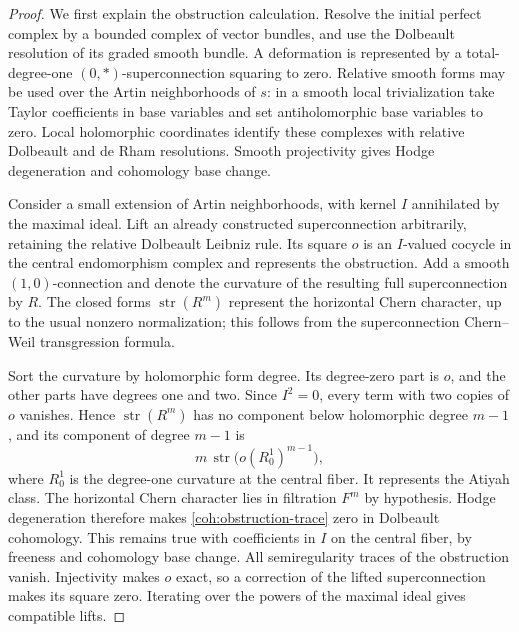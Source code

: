 \documentclass[11pt]{article}
\numberwithin{equation}{section}
\theoremstyle{definition}
\theoremstyle{remark}
\begin{document}
\begin{proof}
We first explain the obstruction calculation.  Resolve the initial
perfect complex by a bounded complex of vector bundles, and use the
Dolbeault resolution of its graded smooth bundle.  A deformation is
represented by a total-degree-one \((0,*)\)-superconnection squaring
to zero.  Relative smooth forms may be used over the Artin
neighborhoods of \(s\): in a smooth local trivialization take Taylor
coefficients in base variables and set antiholomorphic base variables
to zero.  Local holomorphic coordinates identify these complexes with
relative Dolbeault and de Rham resolutions.  Smooth projectivity gives
Hodge degeneration and cohomology base change.

Consider a small extension of Artin neighborhoods, with kernel \(I\)
annihilated by the maximal ideal.  Lift an already constructed
superconnection arbitrarily, retaining the relative Dolbeault Leibniz
rule.  Its square \(o\) is an \(I\)-valued cocycle in the central
endomorphism complex and represents the obstruction.  Add a smooth
\((1,0)\)-connection and denote the curvature of the resulting full
superconnection by \(R\).  The closed forms \(\operatorname{str}(R^m)\) represent
the horizontal Chern character, up to the usual nonzero normalization;
this follows from the superconnection Chern--Weil transgression
formula.

Sort the curvature by holomorphic form degree.  Its degree-zero part
is \(o\), and the other parts have degrees one and two.  Since
\(I^2=0\), every term with two copies of \(o\) vanishes.  Hence
\(\operatorname{str}(R^m)\) has no component below holomorphic degree \(m-1\),
and its component of degree \(m-1\) is
\begin{equation}\label{coh:obstruction-trace}
 m\,\operatorname{str}\bigl(o(R^1_0)^{m-1}\bigr),
\end{equation}
where \(R^1_0\) is the degree-one curvature at the central fiber.
It represents the Atiyah class.  The horizontal Chern character lies
in filtration \(F^m\) by hypothesis.  Hodge degeneration therefore
makes \eqref{coh:obstruction-trace} zero in Dolbeault cohomology.
This remains true with coefficients in \(I\) on the central fiber,
by freeness and cohomology base change.  All semiregularity traces of
the obstruction vanish.  Injectivity makes \(o\) exact, so a
correction of the lifted superconnection makes its square zero.
Iterating over the powers of the maximal ideal gives compatible lifts.


\end{proof}
\end{document}
